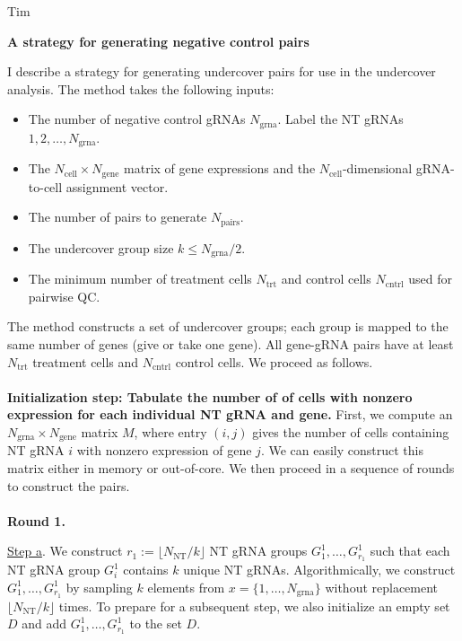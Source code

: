 \documentclass[12pt]{article}
\begin{document}



\noindent
Tim

\begin{center}
\textbf{A strategy for generating negative control pairs}
\end{center}

I describe a strategy for generating undercover pairs for use in the undercover analysis. The method takes the following inputs:

\begin{itemize}
\item The number of negative control gRNAs $N_\textrm{grna}$. Label the NT gRNAs $1, 2, \dots, N_\textrm{grna}$.
\item The $N_\textrm{cell} \times N_\textrm{gene}$ matrix of gene expressions and the $N_\textrm{cell}$-dimensional gRNA-to-cell assignment vector.
\item The number of pairs to generate $N_\textrm{pairs}$.
\item The undercover group size $k \leq N_\textrm{grna}/2$.
\item The minimum number of treatment cells $N_\textrm{trt}$ and control cells $N_\textrm{cntrl}$ used for pairwise QC.
\end{itemize}

The method constructs a set of undercover groups; each group is mapped to the same number of genes (give or take one gene). All gene-gRNA pairs have at least $N_\textrm{trt}$ treatment cells and $N_\textrm{cntrl}$ control cells. We proceed as follows.
\\ \\
\textbf{Initialization step: Tabulate the number of of cells with nonzero expression for each individual NT gRNA and gene.} First, we compute an $N_\textrm{grna} \times N_\textrm{gene}$ matrix $M$, where entry $(i,j)$ gives the number of cells containing NT gRNA $i$ with nonzero expression of gene $j$. We can easily construct this matrix either in memory or out-of-core. We then proceed in a sequence of rounds to construct the pairs.
\\ \\
\textbf{Round 1.} 

\underline{Step a}. We construct $r_1 := \lfloor N_\textrm{NT}/k\rfloor$ NT gRNA groups $G^1_1, \dots, G^1_{r_1}$ such that each NT gRNA group $G^1_i$ contains $k$ unique NT gRNAs. Algorithmically, we construct $G^1_1, \dots, G_{r_1}^1$ by sampling $k$ elements from $x = \{1, \dots, N_\textrm{grna}\}$ without replacement $\lfloor N_\textrm{NT}/k \rfloor$ times. To prepare for a subsequent step, we also initialize an empty set $D$ and add $G^1_1, \dots, G^1_{r_1}$ to the set $D$. 
\end{document}
